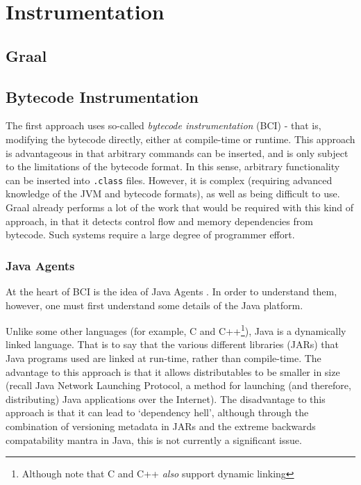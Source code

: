 \chapter{Instrumentation} \label{chp:instrumentation}
\section{Graal} \label{sec:instrumentation/graal}


\section{Bytecode Instrumentation} \label{sec:instrumentation/bytecode-instr}
	The first approach uses so-called \textit{bytecode instrumentation} (BCI) - that is, modifying the bytecode directly, either at compile-time or runtime. This approach is advantageous in that arbitrary commands can be inserted, and is only subject to the limitations of the bytecode format. In this sense, arbitrary functionality can be inserted into \texttt{.class} files. However, it is complex (requiring advanced knowledge of the JVM and bytecode formats), as well as being difficult to use. Graal already performs a lot of the work that would be required with this kind of approach, in that it detects control flow and memory dependencies from bytecode. Such systems require a large degree of programmer effort.

	\subsection{Java Agents} \label{sec:instrumentation/bytecode-instr/agents}
	At the heart of BCI is the idea of Java Agents \citep{javaagents}. In order to understand them, however, one must first understand some details of the Java platform.
	
	Unlike some other languages (for example, C and C++\footnote{Although note that C and C++ \emph{also} support dynamic linking}), Java is a dynamically linked language. That is to say that the various different libraries (JARs) that Java programs used are linked at run-time, rather than compile-time. The advantage to this approach is that it allows distributables to be smaller in size (recall Java Network Launching Protocol, a method for launching (and therefore, distributing) Java applications over the Internet). The disadvantage to this approach is that it can lead to `dependency hell', although through the combination of versioning metadata in JARs and the extreme backwards compatability mantra in Java, this is not currently a significant issue.
	
